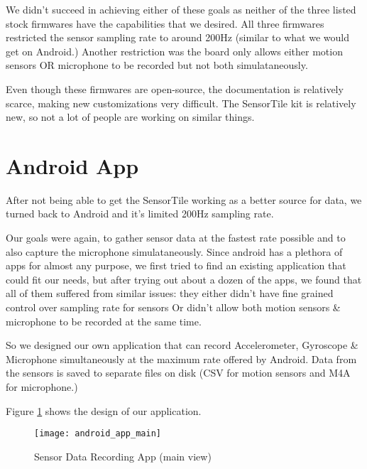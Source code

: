 We didn’t succeed in achieving either of these goals as neither of the three listed stock firmwares have the capabilities that we desired. All three firmwares restricted the sensor sampling rate to around 200Hz (similar to what we would get on Android.) Another restriction was the board only allows either motion sensors OR microphone to be recorded but not both simulataneously.

Even though these firmwares are open-source, the documentation is relatively scarce, making new customizations very difficult. The SensorTile kit is relatively new, so not a lot of people are working on similar things.

\newpage
\section{Android App}

After not being able to get the SensorTile working as a better source for data, we turned back to Android and it's limited 200Hz sampling rate.

Our goals were again, to gather sensor data at the fastest rate possible and to also capture the microphone simulataneously. Since android has a plethora of apps for almost any purpose, we first tried to find an existing application that could fit our needs, but after trying out about a dozen of the apps, we found that all of them suffered from similar issues: they either didn’t have fine grained control over sampling rate for sensors Or didn’t allow both motion sensors \& microphone to be recorded at the same time.

So we designed our own application that can record Accelerometer, Gyroscope \& Microphone simultaneously at the maximum rate offered by Android. Data from the sensors is saved to separate files on disk (CSV for motion sensors and M4A for microphone.)

Figure \ref{fig:android_app_main} shows the design of our application.

\begin{figure}[H] \begin{center}
\texttt{[image: android\_app\_main]}
\caption{Sensor Data Recording App (main view)}
\label{fig:android_app_main}



\end{center} \end{figure}

